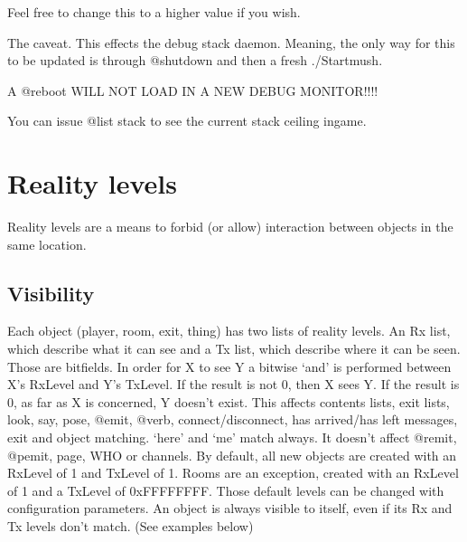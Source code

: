 \documentclass[letterpaper,10pt,english]{sphinxmanual}
\begin{document}
\sphinxAtStartPar
Feel free to change this to a higher value if you wish.

\sphinxAtStartPar
The caveat.  This effects the debug stack daemon.  Meaning,
the only way for this to be updated is through @shutdown and
then a fresh ./Startmush.

\sphinxAtStartPar
A @reboot WILL NOT LOAD IN A NEW DEBUG MONITOR!!!!

\sphinxAtStartPar
You can issue @list stack to see the current stack ceiling ingame.


\chapter{Reality levels}
\label{\detokenize{19-reality:reality-levels}}\label{\detokenize{19-reality::doc}}
\sphinxAtStartPar
Reality levels are a means to forbid (or allow) interaction between objects
in the same location.


\section{Visibility}
\label{\detokenize{19-reality:visibility}}
\sphinxAtStartPar
Each object (player, room, exit, thing) has two lists of reality levels.
An Rx list, which describe what it can see and a Tx list, which describe
where it can be seen. Those are bitfields. In order for X to see Y a bitwise
‘and’ is performed between X’s RxLevel and Y’s TxLevel. If the result is not
0, then X sees Y. If the result is 0, as far as X is concerned, Y doesn’t
exist. This affects contents lists, exit lists, look, say, pose, @emit,
@verb, connect/disconnect, has arrived/has left messages, exit and object
matching. ‘here’ and ‘me’ match always.
It doesn’t affect @remit, @pemit, page, WHO or channels.
By default, all new objects are created with an RxLevel of 1 and TxLevel of
1. Rooms are an exception, created with an RxLevel of 1 and a TxLevel of
0xFFFFFFFF. Those default levels can be changed with configuration
parameters.
An object is always visible to itself, even if its Rx and Tx levels don’t
match. (See examples below)
\end{document}
